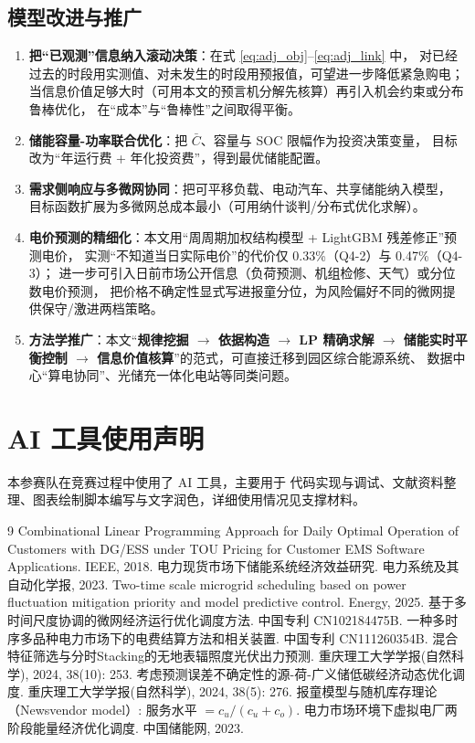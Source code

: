 \documentclass[12pt,a4paper,fontset=fandol]{ctexart}
\newcommand{\CumcmAIUsed}[1]{%
  \section*{AI 工具使用声明}
  本参赛队在竞赛过程中使用了 AI 工具，主要用于 #1，详细使用情况见支撑材料。}
\begin{document}
\subsection{模型改进与推广}

\begin{enumerate}[label=(\arabic*), leftmargin=2.2em, itemsep=2pt]
\item \textbf{把“已观测\nobreak”信息纳入滚动决策}\nobreak：在式 \eqref{eq:adj_obj}--\eqref{eq:adj_link} 中\nobreak，
对已经过去的时段用实测值\nobreak、对未发生的时段用预报值\nobreak，可望进一步降低紧急购电\nobreak；
当信息价值足够大时（可用本文的预言机分解先核算\nobreak）再引入机会约束或分布鲁棒优化\nobreak，
在“成本\nobreak”与“鲁棒性\nobreak”之间取得平衡\nobreak。
\item \textbf{储能容量-功率联合优化}\nobreak：把 $\bar C$\nobreak、容量与 SOC 限幅作为投资决策变量\nobreak，
目标改为“年运行费 + 年化投资费\nobreak”\nobreak，得到最优储能配置\nobreak。
\item \textbf{需求侧响应与多微网协同}\nobreak：把可平移负载\nobreak、电动汽车\nobreak、共享储能纳入模型\nobreak，
目标函数扩展为多微网总成本最小（可用纳什谈判/分布式优化求解\nobreak）\nobreak。
\item \textbf{电价预测的精细化}\nobreak：本文用“周周期加权结构模型 + LightGBM 残差修正\nobreak”预测电价\nobreak，
实测“不知道当日实际电价\nobreak”的代价仅 0.33\%（Q4-2\nobreak）与 0.47\%（Q4-3\nobreak）\nobreak；
进一步可引入日前市场公开信息（负荷预测、机组检修、天气\nobreak）或分位数电价预测\nobreak，
把价格不确定性显式写进报童分位\nobreak，为风险偏好不同的微网提供保守/激进两档策略\nobreak。
\item \textbf{方法学推广}\nobreak：本文“\textbf{规律挖掘 $\to$ 依据构造 $\to$ LP 精确求解 $\to$
储能实时平衡控制 $\to$ 信息价值核算}\nobreak”的范式\nobreak，可直接迁移到园区综合能源系统\nobreak、
数据中心“算电协同\nobreak”\nobreak、光储充一体化电站等同类问题\nobreak。
\end{enumerate}


\CumcmAIUsed{代码实现与调试、文献资料整理、图表绘制脚本编写与文字润色}


\begin{thebibliography}{9}
 Combinational Linear Programming Approach for Daily Optimal Operation of Customers with
DG/ESS under TOU Pricing for Customer EMS Software Applications. IEEE, 2018.
 电力现货市场下储能系统经济效益研究. 电力系统及其自动化学报, 2023.
 Two-time scale microgrid scheduling based on power fluctuation mitigation priority and
model predictive control. Energy, 2025.
 基于多时间尺度协调的微网经济运行优化调度方法. 中国专利 CN102184475B.
 一种多时序多品种电力市场下的电费结算方法和相关装置. 中国专利 CN111260354B.
 混合特征筛选与分时Stacking的无地表辐照度光伏出力预测. 重庆理工大学学报(自然科学), 2024, 38(10): 253.
 考虑预测误差不确定性的源-荷-广义储低碳经济动态优化调度. 重庆理工大学学报(自然科学), 2024, 38(5): 276.
 报童模型与随机库存理论（Newsvendor model\nobreak）: 服务水平 $=c_u/(c_u+c_o)$.
 电力市场环境下虚拟电厂两阶段能量经济优化调度. 中国储能网, 2023.
\end{thebibliography}
\end{document}
